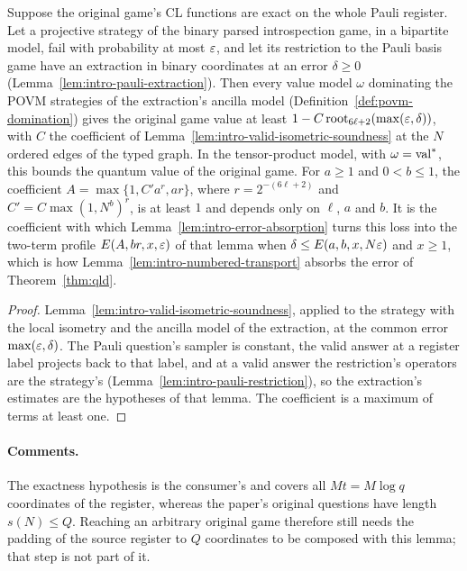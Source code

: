 \begin{lemma}
\label{lem:intro-extracted-soundness}
\leanok
Suppose the original game's CL functions are exact on the whole Pauli register. Let a projective
strategy of the binary parsed introspection game, in a bipartite model, fail with probability at
most $\varepsilon$, and let its restriction to the Pauli basis game have an extraction in binary
coordinates at an error $\delta \geq 0$ (Lemma~\ref{lem:intro-pauli-extraction}). Then every value
model $\omega$ dominating the POVM strategies of the extraction's ancilla model
(Definition~\ref{def:povm-domination}) gives the original game value at least $1 -
C\,\mathrm{root}_{6\ell+2}(\max(\varepsilon, \delta))$, with $C$ the coefficient of
Lemma~\ref{lem:intro-valid-isometric-soundness} at the $N$ ordered edges of the typed graph. In the
tensor-product model, with $\omega = \mathrm{val}^*$, this bounds the quantum value of the original game.
For $a \geq 1$ and $0 < b \leq 1$, the coefficient $A = \max\{1, C' a^r, ar\}$, where $r =
2^{-(6\ell+2)}$ and $C' = C\max(1, N^b)^r$, is at least $1$ and depends only on $\ell$, $a$ and $b$.
It is the coefficient with which Lemma~\ref{lem:intro-error-absorption} turns this loss into the
two-term profile $E(A, br, x, \varepsilon)$ of that lemma when $\delta \leq E(a, b, x, N\varepsilon)$ and $x \geq
1$, which is how Lemma~\ref{lem:intro-numbered-transport} absorbs the error of
Theorem~\ref{thm:qld}.
\end{lemma}

\begin{proof}
\leanok
Lemma~\ref{lem:intro-valid-isometric-soundness}, applied to the strategy with the local isometry
and the ancilla model of the extraction, at the common error $\max(\varepsilon, \delta)$. The Pauli
question's sampler is constant, the valid answer at a register label projects back to that label,
and at a valid answer the restriction's operators are the strategy's
(Lemma~\ref{lem:intro-pauli-restriction}), so the extraction's estimates are the hypotheses of that
lemma. The coefficient is a maximum of terms at least one.
\end{proof}

\paragraph{Comments.} The exactness hypothesis is the consumer's and covers all $M t = M \log q$
coordinates of the register, whereas the paper's original questions have length $s(N) \leq Q$.
Reaching an arbitrary original game therefore still needs the padding of the source register to
$Q$ coordinates to be composed with this lemma; that step is not part of it.

